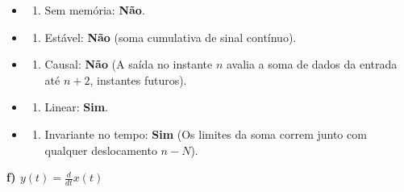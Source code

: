 \begin{itemize}
\tightlist
\item
  \begin{enumerate}
  \def\labelenumi{(\roman{enumi})}
  \tightlist
  \item
    Sem memória: \textbf{Não}.
  \end{enumerate}
\item
  \begin{enumerate}
  \def\labelenumi{(\roman{enumi})}
  \setcounter{enumi}{1}
  \tightlist
  \item
    Estável: \textbf{Não} (soma cumulativa de sinal contínuo).
  \end{enumerate}
\item
  \begin{enumerate}
  \def\labelenumi{(\roman{enumi})}
  \setcounter{enumi}{2}
  \tightlist
  \item
    Causal: \textbf{Não} (A saída no instante \(n\) avalia a soma de dados da entrada até \(n+2\), instantes futuros).
  \end{enumerate}
\item
  \begin{enumerate}
  \def\labelenumi{(\roman{enumi})}
  \setcounter{enumi}{3}
  \tightlist
  \item
    Linear: \textbf{Sim}.
  \end{enumerate}
\item
  \begin{enumerate}
  \def\labelenumi{(\alph{enumi})}
  \setcounter{enumi}{21}
  \tightlist
  \item
    Invariante no tempo: \textbf{Sim} (Os limites da soma correm junto com qualquer deslocamento \(n-N\)).
  \end{enumerate}
\end{itemize}

\textbf{f) \(y(t) = \frac{d}{dt}x(t)\)}

